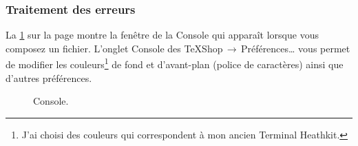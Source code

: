 \documentclass[11pt,french]{article}
\newcommand{\cmd}[1]{\textsf{#1}}
\newcommand{\mnu}[1]{\textsf{#1}}
\newcommand{\To}{\,\(\to\)\,}
\begin{document}
\subsubsection{Traitement des erreurs}



La \cref{ConsoleWindow} sur la page  montre la fenêtre de la \cmd{Console} qui apparaît lorsque vous composez un fichier. L'onglet \cmd{Console} des \mnu{TeXShop}\To\mnu{Préférences…} vous permet de modifier les couleurs\footnote{J'ai choisi des couleurs qui correspondent à mon ancien Terminal Heathkit.} de fond et d'avant-plan (police de caractères) ainsi que d'autres préférences.

\begin{figure}
\centering
{}
\caption{Console.\label{ConsoleWindow}}
\end{figure}

\end{document}
